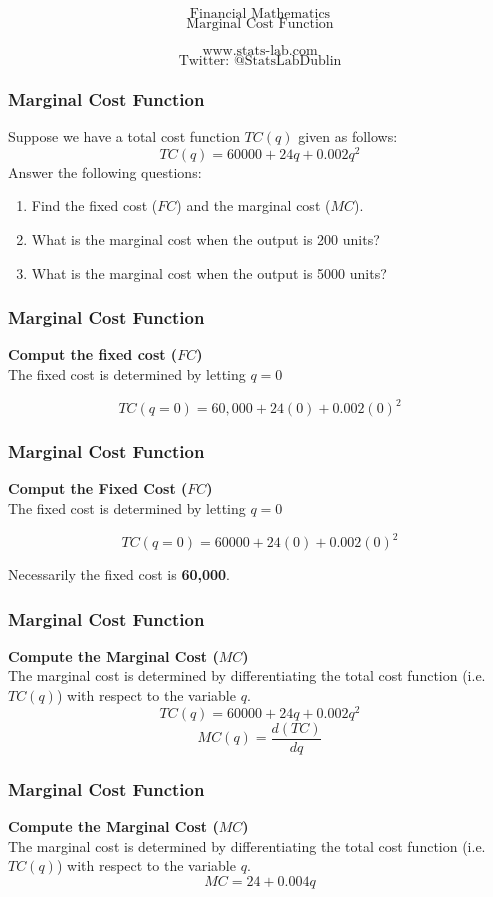 \documentclass{beamer}
\begin{document}
\begin{frame}
\Huge
\[\mbox{Financial Mathematics}\]
\LARGE
\[\mbox{Marginal Cost Function}\]

\Large
\[\mbox{www.stats-lab.com}\]
\[\mbox{Twitter: @StatsLabDublin}\]

\end{frame}

\begin{frame}
\frametitle{Marginal Cost Function}
\Large
Suppose we have a total cost function $TC(q)$ given as follows:
\[TC(q) = 60000 + 24q + 0.002q^2\]
Answer the following questions:
\begin{enumerate}
\item Find the fixed cost ($FC$) and the marginal cost ($MC$).
\item What is the marginal cost when the output is 200 units?
\item What is the marginal cost when the output is 5000 units?
\end{enumerate}
\end{frame}
\begin{frame}
\frametitle{Marginal Cost Function}
\Large
\textbf{Comput the fixed cost ($FC$) }\\
\bigskip
The fixed cost is determined by letting $q=0$

\[TC(q=0) = 60,000 + 24(0) + 0.002(0)^2 \]

\end{frame}
\begin{frame}
\frametitle{Marginal Cost Function}
\Large
\textbf{Comput the Fixed Cost ($FC$) }\\
\bigskip
The fixed cost is determined by letting $q=0$

\[TC(q=0) = 60000 + 24(0) + 0.002(0)^2 \]

Necessarily the fixed cost is \textbf{60,000}.
\end{frame}


\begin{frame}
\frametitle{Marginal Cost Function}
\Large
\vspace{-1.5cm}
\textbf{Compute the Marginal Cost ($MC$) }\\
\bigskip
The marginal cost is determined by differentiating the total cost function (i.e. $TC(q)$) with respect to the variable $q$.
\[TC(q) = 60000 + 24q + 0.002q^2\]
\[MC(q) = \frac{d(TC)}{dq}\]

\end{frame}

\begin{frame}
\frametitle{Marginal Cost Function}
\Large
\vspace{-1.8cm}
\textbf{Compute the Marginal Cost ($MC$) }\\
\bigskip
The marginal cost is determined by differentiating the total cost function (i.e. $TC(q)$) with respect to the variable $q$.
\LARGE
\[MC =  24 + 0.004q\]

\end{frame}
\end{document}
